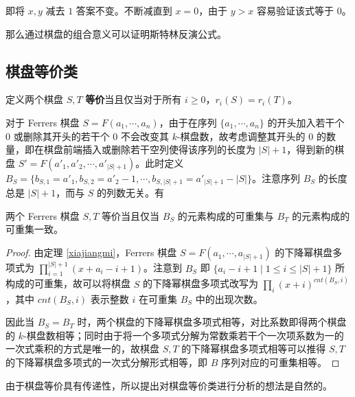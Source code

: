 \documentclass{noithesis}
\begin{document}
	即将 $x,y$ 减去 $1$ 答案不变。不断减直到 $x=0$，由于 $y>x$ 容易验证该式等于 $0$。
	
	那么通过棋盘的组合意义可以证明斯特林反演公式。
	
	\subsection{棋盘等价类}
	
	\begin{definition}[棋盘等价]
		定义两个棋盘 $S,T$ \textbf{等价}当且仅当对于所有 $i \geq 0$，$r_i(S) = r_i(T)$。
	\end{definition}
	
	对于 Ferrers 棋盘 $S = F(a_1,\cdots,a_n)$，由于在序列 $\{a_1,\cdots,a_n\}$ 的开头加入若干个 $0$ 或删除其开头的若干个 $0$ 不会改变其 $k$-棋盘数，故考虑调整其开头的 $0$ 的数量，即在棋盘前端插入或删除若干空列使得该序列的长度为 $|S| + 1$，得到新的棋盘 $S' = F(a'_1,a'_2,\cdots,a'_{|S|+1})$。此时定义 $B_S = \{b_{S,1} = a'_1,b_{S,2} = a'_2-1,\cdots , b_{S,|S|+1} = a'_{|S|+1}-|S|\}$。注意序列 $B_S$ 的长度总是 $|S| + 1$，而与 $S$ 的列数无关。有
	\begin{theorem} \label{equal}
		两个 Ferrers 棋盘 $S,T$ 等价当且仅当 $B_S$ 的元素构成的可重集与 $B_T$ 的元素构成的可重集一致。
	\end{theorem}
	\begin{proof}
		由定理 \ref{xiajiangmi}，Ferrers 棋盘 $S = F(a_1,\cdots,a_{|S| + 1})$ 的下降幂棋盘多项式为 $\prod_{i=1}^{|S|+1}(x+a_i-i+1)$。注意到 $B_S$ 即 $\{a_i-i+1 \mid 1 \leq i \leq |S|+1\}$ 所构成的可重集，故可以将棋盘 $S$ 的下降幂棋盘多项式改写为 $\prod_i (x+i)^{cnt(B_S , i)}$，其中 $cnt(B_S , i)$ 表示整数 $i$ 在可重集 $B_S$ 中的出现次数。
		
		因此当 $B_S = B_T$ 时，两个棋盘的下降幂棋盘多项式相等，对比系数即得两个棋盘的 $k$-棋盘数相等；同时由于将一个多项式分解为常数乘若干个一次项系数为一的一次式乘积的方式是唯一的，故棋盘 $S,T$ 的下降幂棋盘多项式相等可以推得 $S,T$ 的下降幂棋盘多项式的一次式分解形式相等，即 $B$ 序列对应的可重集相等。
	\end{proof}
	
	由于棋盘等价具有传递性，所以提出对棋盘等价类进行分析的想法是自然的。
	
\end{document}
